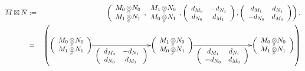 \documentclass[10pt]{amsart}
\theoremstyle{break}
\begin{document}
\begin{eqnarray*}
\overline{M}\boxtimes \overline{N} &:=&
\left(\begin{array}{c}
		M_0{{\,\otimes\hspace{-0.7em}\raisebox{-0.5ex}{${}_{{}_{S}}$}\,}} N_0\\
		M_1{{\,\otimes\hspace{-0.7em}\raisebox{-0.5ex}{${}_{{}_{S}}$}\,}} N_1
	\end{array},
	\begin{array}{c}
		M_1{{\,\otimes\hspace{-0.7em}\raisebox{-0.5ex}{${}_{{}_{S}}$}\,}} N_0\\
		M_0{{\,\otimes\hspace{-0.7em}\raisebox{-0.5ex}{${}_{{}_{S}}$}\,}} N_1
	\end{array},
	\left(
		\begin{array}{cc}
			d_{M_0}&-d_{N_1}\\
			d_{N_0}&d_{M_1}
		\end{array}
	    \right),
	    \left(
		\begin{array}{cc}
			d_{M_1}&d_{N_1}\\
			-d_{N_0}&d_{M_0}
		\end{array}
	    \right)\right)
,\\
&=&\left(
\xymatrix{
*^{\left(
	\begin{array}{c}
		M_0{{\,\otimes\hspace{-0.7em}\raisebox{-0.5ex}{${}_{{}_{S}}$}\,}} N_0\\
		M_1{{\,\otimes\hspace{-0.7em}\raisebox{-0.5ex}{${}_{{}_{S}}$}\,}} N_1
	\end{array}
    \right)}
\ar[rrr]_{\left(
		\begin{array}{cc}
			d_{M_0}&-d_{N_1}\\
			d_{N_0}&d_{M_1}
		\end{array}
	    \right)}&&&
*^{\left(
	\begin{array}{c}
		M_1{{\,\otimes\hspace{-0.7em}\raisebox{-0.5ex}{${}_{{}_{S}}$}\,}} N_0\\
		M_0{{\,\otimes\hspace{-0.7em}\raisebox{-0.5ex}{${}_{{}_{S}}$}\,}} N_1
	\end{array}
    \right)}
\ar[rrr]_{\left(
		\begin{array}{cc}
			d_{M_1}&d_{N_1}\\
			-d_{N_0}&d_{M_0}
		\end{array}
	    \right)}
&&&*^{\left(
	\begin{array}{c}
		M_0{{\,\otimes\hspace{-0.7em}\raisebox{-0.5ex}{${}_{{}_{S}}$}\,}} N_0\\
		M_1{{\,\otimes\hspace{-0.7em}\raisebox{-0.5ex}{${}_{{}_{S}}$}\,}} N_1
	\end{array}
    \right)}
}
\right)
\end{eqnarray*}
\end{document}
